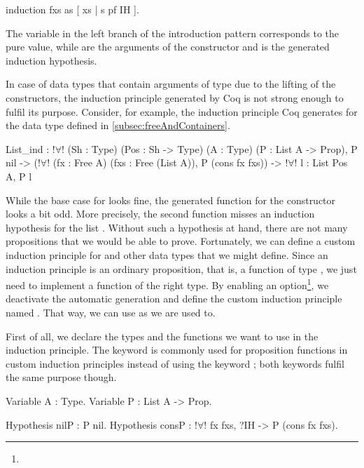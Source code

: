 \begin{coqcode}
induction fxs as [ xs | s pf IH ].
\end{coqcode}

The variable  in the left branch of the introduction pattern corresponds to the pure value, while   are the arguments of the  constructor and  is the generated induction hypothesis.

In case of data types that contain arguments of type  due to the lifting of the constructors, the induction principle generated by Coq is not strong enough to fulfil its purpose.
Consider, for example, the induction principle Coq generates for the  data type defined in \autoref{subsec:freeAndContainers}.

\begin{coqcode}
List_ind : !$\forall$! (Sh : Type) (Pos : Sh -> Type) (A : Type) (P : List A -> Prop),
      P nil ->
      (!$\forall$! (fx : Free A) (fxs : Free (List A)), P (cons fx fxs)) ->
      !$\forall$! l : List Pos A, P l
\end{coqcode}

While the base case for  looks fine, the generated function for the  constructor looks a bit odd.
More precisely, the second function misses an induction hypothesis for the list .
Without such a hypothesis at hand, there are not many propositions that we would be able to prove.
Fortunately, we can define a custom induction principle for  and other data types that we might define.
Since an induction principle is an ordinary proposition, that is, a function of type , we just need to implement a function of the right type.
By enabling an option\footnote{}, we deactivate the automatic generation and define the custom induction principle named .
That way, we can use  as we are used to.

First of all, we declare the types and the functions we want to use in the induction principle.
The keyword  is commonly used for proposition functions in custom induction principles instead of using the keyword ; both keywords fulfil the same purpose though.

\begin{coqcode}
Variable A : Type.
Variable P : List A -> Prop.

Hypothesis nilP : P nil.
Hypothesis consP : !$\forall$! fx fxs, ?IH -> P (cons fx fxs).
\end{coqcode}

